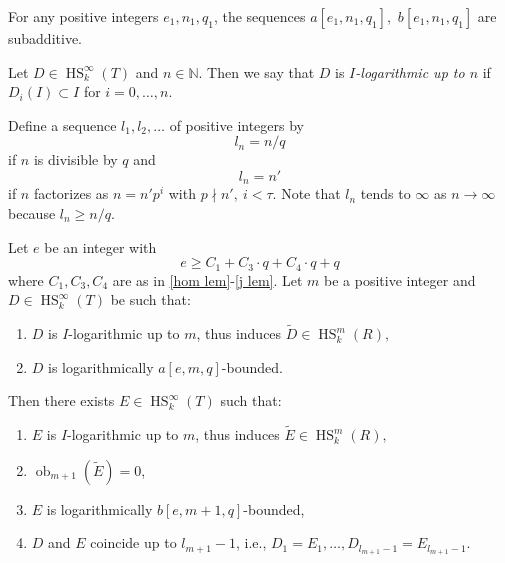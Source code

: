 \documentclass{amsart}
\newcommand{\HS}{\operatorname{HS}}
\begin{document}
\begin{lemma}
    For any positive integers $e_1, n_1,q_1$, the sequences $a[e_1,n_1,q_1],$ $b[e_1,n_1,q_1]$ are subadditive.
\end{lemma}




\begin{definition}
    Let $D\in \HS_k^\infty(T)$ and $n\in \mathbb{N}$. Then we say that $D$ is {\em $I$-logarithmic up to $n$} if 
    $D_i(I)\subset I$ for $i=0,\dots, n$.
\end{definition}

\begin{definition}\label{l_n def}
    Define a sequence $l_1,l_2,\dots$ of positive integers by
    $$l_n=n/q$$
    if $n$ is divisible by $q$ and
    $$l_n=n'$$
    if $n$ factorizes as $n=n'p^i$ with $p\nmid n',\ i<\tau$. Note that $l_n$ tends to $\infty$ as $n\to \infty$ because $l_n\ge n/q$.
\end{definition}

\begin{proposition}\label{a to b extension prop}
    Let $e$ be an integer with
    $$e\ge C_1+C_3\cdot q+C_4\cdot q+q$$
    where $C_1,C_3,C_4$ are as in \ref{hom lem}-\ref{j lem}. Let $m$ be a positive integer and $D\in \HS_k^\infty(T)$ be such that:
    \begin{enumerate}
        \item $D$ is $I$-logarithmic up to $m$, thus induces $\widetilde{D}\in \HS_k^m(R),$
        \item $D$ is logarithmically $a[e,m,q]$-bounded.
    \end{enumerate}
    Then there exists $E\in \HS_k^\infty(T)$ such that:
     \begin{enumerate}
        \item $E$ is $I$-logarithmic up to $m$, thus induces $\widetilde{E}\in \HS_k^m(R),$
        \item $\operatorname{ob}_{m+1}(\widetilde{E})=0$,
        \item $E$ is logarithmically $b[e,m+1,q]$-bounded,
        \item $D$ and $E$ coincide up to $l_{m+1}-1$, i.e., $D_1=E_1,\dots,D_{l_{m+1}-1}=E_{l_{m+1}-1}$.
    \end{enumerate}
\end{proposition}
\end{document}
